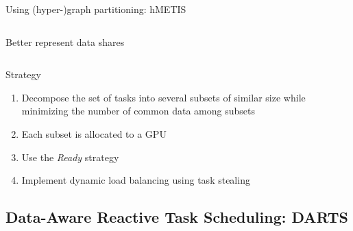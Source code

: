 \documentclass{libs/ufc_format}
\begin{document}
\begin{frame}{Using (hyper-)graph partitioning: hMETIS}
\begin{columns}{}
\begin{column}{0.6\textwidth}
Better represent data shares
\end{column}
\end{columns}
	\begin{block}{Strategy}
	\begin{enumerate}
		\item Decompose the set of tasks into several subsets of similar size while minimizing the number of common data among subsets
		\item Each subset is allocated to a GPU
		\item Use the \emph{Ready} strategy
		\item Implement dynamic load balancing using task stealing
	\end{enumerate}
	\end{block}
\end{frame}

\subsection{Data-Aware Reactive Task Scheduling: DARTS}


	
\end{document}

